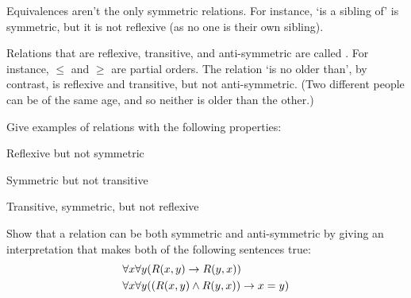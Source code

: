 Equivalences aren't the only symmetric relations. For instance, `is a
sibling of' is symmetric, but it is not reflexive (as no one is their own
sibling).

Relations that are reflexive, transitive, and anti-symmetric are
called . For instance, $\le$ and $\ge$ are
partial orders. The relation `is no older than', by contrast, is
reflexive and transitive, but not anti-symmetric. (Two different
people can be of the same age, and so neither is older than the
other.)

\practiceproblems

\problempart
Give examples of relations with the following properties:
\begin{compactlist}
	\item Reflexive but not symmetric
	\item Symmetric but not transitive
	\item Transitive, symmetric, but not reflexive
\end{compactlist}

\problempart
Show that a relation can be both symmetric and anti-symmetric by
giving an interpretation that makes both of the following sentences
true:
\begin{align*}
	& \forall x\forall y(\mathord{R}(x,y) \rightarrow \mathord{R}(y,x))\\
	& \forall x\forall y((\mathord{R}(x,y) \wedge \mathord{R}(y,x)) \rightarrow x=y)
\end{align*}

